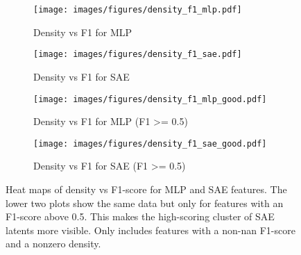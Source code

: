 \begin{figure}[h]
    \centering
    
    \begin{subfigure}[b]{0.45\textwidth}
        \centering
        \texttt{[image: images/figures/density\_f1\_mlp.pdf]}
        \caption{Density vs F1 for MLP}
        \label{fig:density_f1_mlp}
    \end{subfigure}
    \begin{subfigure}[b]{0.45\textwidth}
        \centering
        \texttt{[image: images/figures/density\_f1\_sae.pdf]}
        \caption{Density vs F1 for SAE}
        \label{fig:density_f1_sae}
    \end{subfigure}
    
    
    \begin{subfigure}[b]{0.45\textwidth}
        \centering
        \texttt{[image: images/figures/density\_f1\_mlp\_good.pdf]}
        \caption{Density vs F1 for MLP (F1 >= 0.5)}
        \label{fig:density_f1_mlp_good}
    \end{subfigure}
    \begin{subfigure}[b]{0.45\textwidth}
        \centering
        \texttt{[image: images/figures/density\_f1\_sae\_good.pdf]}
        \caption{Density vs F1 for SAE (F1 >= 0.5)}
        \label{fig:density_f1_sae_good}
    \end{subfigure}
    
    \caption{Heat maps of density vs F1-score for MLP and SAE features. The lower two plots show the same data but only for features with an F1-score above 0.5. This makes the high-scoring cluster of SAE latents more visible. Only includes features with a non-nan F1-score and a nonzero density.}
    \label{fig:density_f1}
\end{figure}